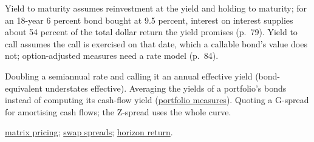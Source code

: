 \begin{qfdefinition}
 Yield to maturity assumes reinvestment at the yield and holding to maturity; for an 18-year 6 percent bond bought at 9.5 percent, interest on interest supplies about 54 percent of the total dollar return the yield promises (p.~79). Yield to call assumes the call is exercised on that date, which a callable bond's value does not; option-adjusted measures need a rate model (p.~84).

 Doubling a semiannual rate and calling it an annual effective yield (bond-equivalent understates effective). Averaging the yields of a portfolio's bonds instead of computing its cash-flow yield (\hyperref[meth:convexity-portfolio-duration]{portfolio measures}). Quoting a G-spread for amortising cash flows; the Z-spread uses the whole curve.

 \hyperref[meth:matrix-pricing]{matrix pricing}; \hyperref[def:swap-curve-short-term-spreads]{swap spreads}; \hyperref[meth:bond-return-decomposition]{horizon return}.

\end{qfdefinition}

